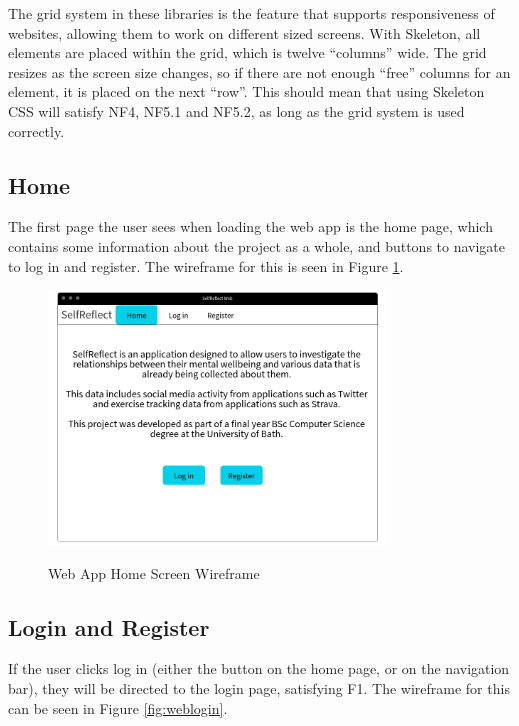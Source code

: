 \documentclass[11pt,openright,a4paper]{report}
\begin{document}
The grid system in these libraries is the feature that supports responsiveness of websites, allowing them to work on different sized screens. With Skeleton, all elements are placed within the grid, which is twelve \enquote{columns} wide. The grid resizes as the screen size changes, so if there are not enough \enquote{free} columns for an element, it is placed on the next \enquote{row}. This should mean that using Skeleton CSS will satisfy NF4, NF5.1 and NF5.2, as long as the grid system is used correctly.

\subsection{Home}
The first page the user sees when loading the web app is the home page, which contains some information about the project as a whole, and buttons to navigate to log in and register. The wireframe for this is seen in Figure \ref{fig:webhome}.

\begin{figure}[ht]
\centering
\caption{Web App Home Screen Wireframe}
\includegraphics[width=0.8\textwidth]{i/webhome.png}
\label{fig:webhome}
\end{figure}

\newpage
\subsection{Login and Register}
If the user clicks log in (either the button on the home page, or on the navigation bar), they will be directed to the login page, satisfying F1. The wireframe for this can be seen in Figure \ref{fig:weblogin}.
\end{document}
